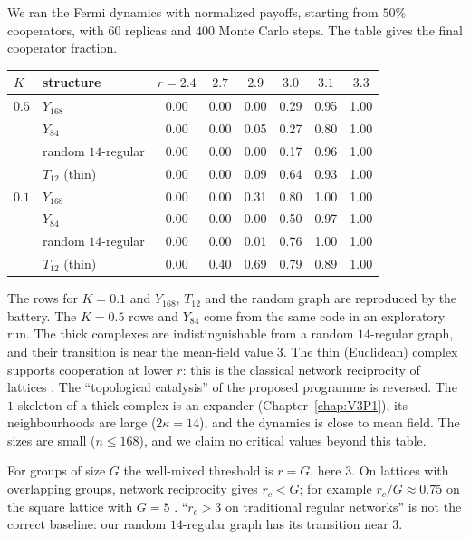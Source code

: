 \begin{remark}\label{V3P5:rem:mc}
We ran the Fermi dynamics with normalized payoffs, starting from $50\%$ cooperators, with $60$
replicas and $400$ Monte Carlo steps. The table gives the final cooperator fraction.
\begin{center}
\small
\begin{tabular}{llcccccc}
\toprule
$K$ & structure & $r=2.4$ & $2.7$ & $2.9$ & $3.0$ & $3.1$ & $3.3$\\
\midrule
$0.5$ & $Y_{168}$ & 0.00 & 0.00 & 0.00 & 0.29 & 0.95 & 1.00\\
& $Y_{84}$ & 0.00 & 0.00 & 0.05 & 0.27 & 0.80 & 1.00\\
& random $14$-regular & 0.00 & 0.00 & 0.00 & 0.17 & 0.96 & 1.00\\
& $T_{12}$ (thin) & 0.00 & 0.00 & 0.09 & 0.64 & 0.93 & 1.00\\
\midrule
$0.1$ & $Y_{168}$ & 0.00 & 0.00 & 0.31 & 0.80 & 1.00 & 1.00\\
& $Y_{84}$ & 0.00 & 0.00 & 0.00 & 0.50 & 0.97 & 1.00\\
& random $14$-regular & 0.00 & 0.00 & 0.01 & 0.76 & 1.00 & 1.00\\
& $T_{12}$ (thin) & 0.00 & 0.40 & 0.69 & 0.79 & 0.89 & 1.00\\
\bottomrule
\end{tabular}
\end{center}
The rows for $K=0.1$ and $Y_{168}$, $T_{12}$ and the random graph are reproduced by the
battery. The $K=0.5$ rows and $Y_{84}$ come from the same code in an exploratory run. The
thick complexes are indistinguishable from a random $14$-regular graph, and their transition is
near the mean-field value $3$. The thin (Euclidean) complex supports cooperation at lower $r$:
this is the classical network reciprocity of lattices \cite{NM92,SPS09}. The ``topological
catalysis'' of the proposed programme is reversed. The $1$-skeleton of a thick complex is an
expander (Chapter~\ref{chap:V3P1}), its neighbourhoods are large ($2\kappa=14$), and the dynamics is close to
mean field. The sizes are small ($n\le168$), and we claim no critical values beyond this table.
\end{remark}

\begin{remark}\label{V3P5:rem:three}
For groups of size $G$ the well-mixed threshold is $r=G$, here $3$. On lattices with
overlapping groups, network reciprocity gives $r_c<G$; for example $r_c/G\approx0.75$ on the
square lattice with $G=5$ \cite{SPS09}. ``$r_c>3$ on traditional regular networks'' is not the
correct baseline: our random $14$-regular graph has its transition near $3$.
\end{remark}

